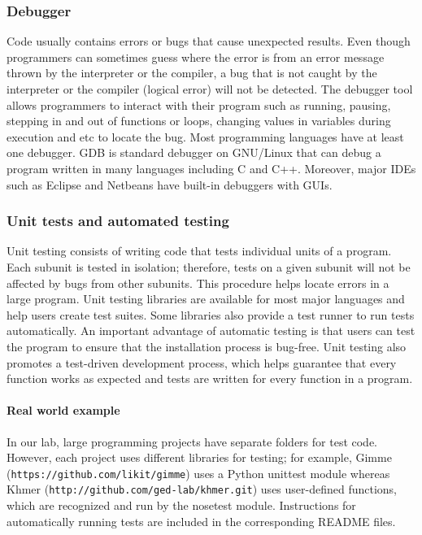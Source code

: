 \documentclass[ChapterTOCs,krantz2]{krantz} %
\begin{document}
\subsubsection{Debugger}

Code usually contains errors or bugs that cause unexpected results.
Even though programmers can sometimes guess where the error is from an error message
thrown by the interpreter or the compiler, a bug that is not caught by the
interpreter or the compiler (logical error) will not be detected.
The debugger tool allows programmers to interact with their program such as
running, pausing, stepping in and out of functions or loops, changing values
in variables during execution and etc to locate the bug.
Most programming languages have at least one debugger.
GDB is standard debugger on GNU/Linux that can debug a program written in many
languages including C and C++.
Moreover, major IDEs such as Eclipse and Netbeans have built-in debuggers
with GUIs. 

\subsubsection{Unit tests and automated testing}

Unit testing consists of writing
code that tests individual units of a program. 
Each subunit is tested in isolation; therefore, tests 
on a given subunit will not be affected by bugs from other subunits. This
procedure helps locate errors in a large program. 
Unit testing libraries are available for most major languages
and help users create test
suites. Some libraries also
provide a test runner to run tests automatically. An important
advantage of automatic testing is that users can
test the program to ensure that the installation process is bug-free.  Unit
testing also promotes a test-driven development process, which 
helps guarantee that
every function works as expected and tests are written for every function in a
program.

\paragraph{Real world example}

In our lab,
large programming projects have separate folders for test code. However, each project uses
different libraries for testing; for example, Gimme
(\texttt{https://github.com/likit/gimme}) uses a Python unittest module whereas Khmer
(\texttt{http://github.com/ged-lab/khmer.git}) uses user-defined functions, which are
recognized and run by the nosetest module. Instructions for automatically
running tests are included in the corresponding README
files.
\end{document}
